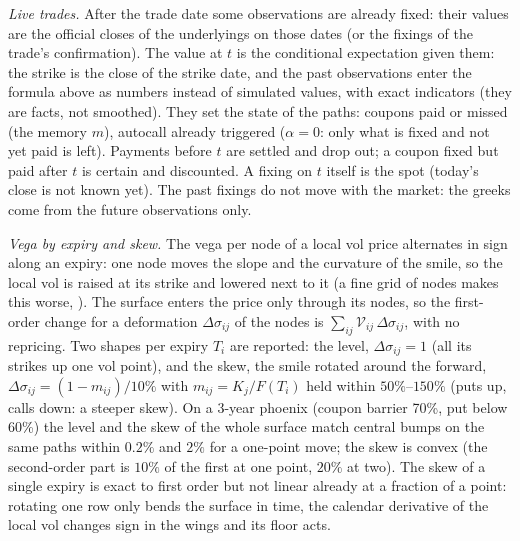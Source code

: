 \emph{Live trades.} After the trade date some observations are already fixed: their values are the official closes
of the underlyings on those dates (or the fixings of the trade's confirmation). The value at $t$ is the conditional
expectation given them: the strike is the close of the strike date, and the past observations enter the formula
above as numbers instead of simulated values, with exact indicators (they are facts, not smoothed). They set the
state of the paths: coupons paid or missed (the memory $m$), autocall already triggered ($\alpha = 0$: only what is
fixed and not yet paid is left). Payments before $t$ are settled and drop out; a coupon fixed but paid after $t$ is
certain and discounted. A fixing on $t$ itself is the spot (today's close is not known yet). The past fixings do not
move with the market: the greeks come from the future observations only.

\emph{Vega by expiry and skew.} The vega per node of a local vol price alternates in sign along an expiry: one node
moves the slope and the curvature of the smile, so the local vol is raised at its strike and lowered next to it
(a fine grid of nodes makes this worse, \citealp[ch.~13]{savine2018}). The surface enters the price only through
its nodes, so the first-order change for a deformation $\Delta\sigma_{ij}$ of the nodes is
$\sum_{ij} \mathcal V_{ij}\,\Delta\sigma_{ij}$, with no repricing. Two shapes per expiry $T_i$ are reported:
the level, $\Delta\sigma_{ij} = 1$ (all its strikes up one vol point), and the skew, the smile rotated around the
forward, $\Delta\sigma_{ij} = (1 - m_{ij})/10\%$ with $m_{ij} = K_j / F(T_i)$ held within $50\%$--$150\%$ (puts up,
calls down: a steeper skew). On a 3-year phoenix (coupon barrier 70\%, put below 60\%) the level and the skew of the
whole surface match central bumps on the same paths within $0.2\%$ and $2\%$ for a one-point move; the skew is convex
(the second-order part is $10\%$ of the first at one point, $20\%$ at two). The skew of a single expiry is exact to
first order but not linear already at a fraction of a point: rotating one row only bends the surface in time, the
calendar derivative of the local vol changes sign in the wings and its floor acts.

